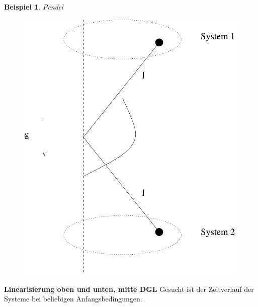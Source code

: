 \message{ !name(Mitschrieb_SysRegel.tex)}\documentclass[12pt,a4paper,ngerman]{scrartcl}
\newtheorem{bsp}{Beispiel}[section] %
\begin{document}
\begin{bsp}
Pendel
\end{bsp}
\begin{figure}[H]
  \centering
  \includegraphics[width=0.4\linewidth]{sysregel_bsp_4_1}
\end{figure}
\textbf{Linearisierung oben und unten, mitte DGL}
Gesucht ist der Zeitverlauf der Systeme bei beliebigen Anfangsbedingungen.
\end{document}
